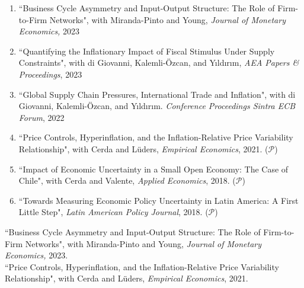 \documentclass[10pt]{article}
\begin{document}
\begin{enumerate}[wide, labelwidth=!, labelindent=0pt]
 \item ``Business Cycle Asymmetry and Input-Output Structure: The Role of Firm-to-Firm Networks", with Miranda-Pinto and Young, \emph{Journal of Monetary Economics,} 2023\\[-0.125in]

\item \noindent ``Quantifying the Inflationary Impact of Fiscal Stimulus Under Supply Constraints", with di Giovanni, Kalemli-\"{O}zcan, and Y{\i}ld{\i}r{\i}m, \emph{AEA Papers \& Proceedings}, 2023\\[-0.125in]

\item \noindent ``Global Supply Chain Pressures, International Trade and Inflation", with di Giovanni, Kalemli-\"{O}zcan, and Y{\i}ld{\i}r{\i}m. {\emph{Conference Proceedings Sintra ECB Forum}, 2022}\\[-0.125in]

\item \noindent ``Price Controls, Hyperinflation, and the Inflation-Relative Price Variability Relationship", with Cerda and L\"{u}ders, \emph{Empirical Economics}, 2021. ($\mathcal{P}$)\\[-0.125in]

\item \noindent ``Impact of Economic Uncertainty in a Small Open Economy: The Case of Chile", with Cerda and Valente, \emph{Applied Economics}, 2018. ($\mathcal{P}$)\\[-0.125in]

\item \noindent ``Towards Measuring Economic Policy Uncertainty in Latin America: A First Little Step", \emph{Latin American Policy Journal}, 2018. ($\mathcal{P}$)\\[-0.125in]
\end{enumerate}
\fi

\noindent ``Business Cycle Asymmetry and Input-Output Structure: The Role of Firm-to-Firm Networks", with Miranda-Pinto and Young, \textit{Journal of Monetary Economics,} 2023.\\[-0.125in]

\noindent ``Price Controls, Hyperinflation, and the Inflation-Relative Price Variability Relationship", with Cerda and L\"{u}ders, \emph{Empirical Economics}, 2021.\\[-0.125in]
   
\end{document}
